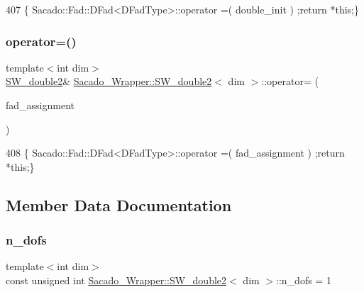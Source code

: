 \begin{DoxyCode}
407 \{ Sacado::Fad::DFad<DFadType>::operator =( double\_init ) ;\textcolor{keywordflow}{return} *\textcolor{keyword}{this};\}
\end{DoxyCode}
\mbox{\label{classSacado__Wrapper_1_1SW__double2_a426ab490411a347540e5af7028638495}} 
\subsubsection{\texorpdfstring{operator=()}{operator=()}\hspace{0.1cm}{\footnotesize\ttfamily [2/2]}}
{\footnotesize\ttfamily template$<$int dim$>$ \\
\hyperlink{classSacado__Wrapper_1_1SW__double2}{S\+W\+\_\+double2}\& \hyperlink{classSacado__Wrapper_1_1SW__double2}{Sacado\+\_\+\+Wrapper\+::\+S\+W\+\_\+double2}$<$ dim $>$\+::operator= (\begin{DoxyParamCaption}\item[{Sacado\+::\+Fad\+::\+D\+Fad$<$ \hyperlink{Sacado__Wrapper_8h_a7e0893207b87dad05c66a34baac8ed2e}{D\+Fad\+Type} $>$}]{fad\+\_\+assignment }\end{DoxyParamCaption})\hspace{0.3cm}{\ttfamily [inline]}}


\begin{DoxyCode}
408 \{ Sacado::Fad::DFad<DFadType>::operator =( fad\_assignment ) ;\textcolor{keywordflow}{return} *\textcolor{keyword}{this};\}
\end{DoxyCode}


\subsection{Member Data Documentation}
\mbox{\label{classSacado__Wrapper_1_1SW__double2_a535aa77392e896e21151bfc63f92e020}} 
\subsubsection{\texorpdfstring{n\+\_\+dofs}{n\_dofs}}
{\footnotesize\ttfamily template$<$int dim$>$ \\
const unsigned int \hyperlink{classSacado__Wrapper_1_1SW__double2}{Sacado\+\_\+\+Wrapper\+::\+S\+W\+\_\+double2}$<$ dim $>$\+::n\+\_\+dofs = 1\hspace{0.3cm}{\ttfamily [static]}}



